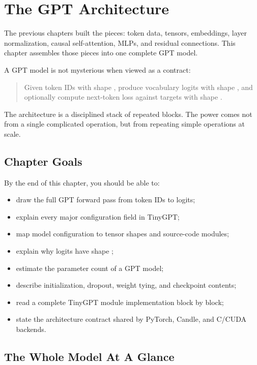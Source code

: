 \chapter{The GPT Architecture}

The previous chapters built the pieces: token data, tensors, embeddings, layer normalization, causal self-attention, MLPs, and residual connections. This chapter assembles those pieces into one complete GPT model.

A GPT model is not mysterious when viewed as a contract:

\begin{quote}
Given token IDs with shape \shape{[B,T]}, produce vocabulary logits with shape \shape{[B,T,V]}, and optionally compute next-token loss against targets with shape \shape{[B,T]}.
\end{quote}

The architecture is a disciplined stack of repeated blocks. The power comes not from a single complicated operation, but from repeating simple operations at scale.

\section{Chapter Goals}

By the end of this chapter, you should be able to:

\begin{itemize}
  \item draw the full GPT forward pass from token IDs to logits;
  \item explain every major configuration field in TinyGPT;
  \item map model configuration to tensor shapes and source-code modules;
  \item explain why logits have shape \shape{[B,T,V]};
  \item estimate the parameter count of a GPT model;
  \item describe initialization, dropout, weight tying, and checkpoint contents;
  \item read a complete TinyGPT module implementation block by block;
  \item state the architecture contract shared by PyTorch, Candle, and C/CUDA backends.
\end{itemize}

\section{The Whole Model At A Glance}

